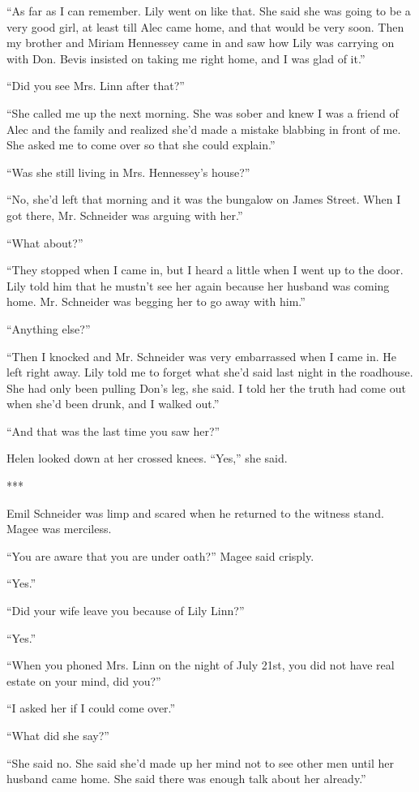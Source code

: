 \documentclass{novel}
\begin{document}
“As far as I can remember. Lily went on like that. She said she was going to be a very good girl, at least till Alec came home, and that would be very soon. Then my brother and Miriam Hennessey came in and saw how Lily was carrying on with Don. Bevis insisted on taking me right home, and I was glad of it.”

“Did you see Mrs. Linn after that?”

“She called me up the next morning. She was sober and knew I was a friend of Alec and the family and realized she’d made a mistake blabbing in front of me. She asked me to come over so that she could explain.”

“Was she still living in Mrs. Hennessey’s house?”

“No, she’d left that morning and it was the bungalow on James Street. When I got there, Mr. Schneider was arguing with her.”

“What about?”

“They stopped when I came in, but I heard a little when I went up to the door. Lily told him that he mustn’t see her again because her husband was coming home. Mr. Schneider was begging her to go away with him.”

“Anything else?”

“Then I knocked and Mr. Schneider was very embarrassed when I came in. He left right away. Lily told me to forget what she’d said last night in the roadhouse. She had only been pulling Don’s leg, she said. I told her the truth had come out when she’d been drunk, and I walked out.”

“And that was the last time you saw her?”

Helen looked down at her crossed knees. “Yes,” she said.

***

Emil Schneider was limp and scared when he returned to the witness stand. Magee was merciless.

“You are aware that you are under oath?” Magee said crisply.

“Yes.”

“Did your wife leave you because of Lily Linn?”

“Yes.”

“When you phoned Mrs. Linn on the night of July 21st, you did not have real estate on your mind, did you?”

“I asked her if I could come over.”

“What did she say?”

“She said no. She said she’d made up her mind not to see other men until her husband came home. She said there was enough talk about her already.”
\end{document}
